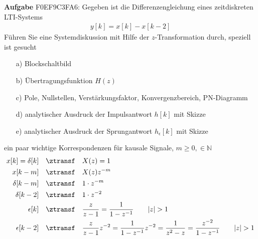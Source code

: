 \textbf{Aufgabe} {\tiny F0EF9C3FA6}:
%
Gegeben ist die Differenzengleichung eines zeitdiskreten LTI-Systems
\begin{align}
y[k] = x[k] - x[k-2]
\end{align}
Führen Sie eine Systemdiskussion mit Hilfe der $z$-Transformation durch, speziell
ist gesucht
\begin{itemize}
\item[a)] Blockschaltbild
\item[b)] Übertragungsfunktion $H(z)$
\item[c)] Pole, Nullstellen, Verstärkungsfaktor, Konvergenzbereich, PN-Diagramm
\item[d)] analytischer Ausdruck der Impulsantwort $h[k]$ mit Skizze
\item[e)] analytischer Ausdruck der Sprungantwort $h_\epsilon[k]$ mit Skizze
\end{itemize}

\begin{Werkzeug}
ein paar wichtige Korrespondenzen für kausale Signale, $m\geq 0, \in\mathbb{N}$
\begin{align}
x[k] = \delta[k]  \quad\ztransf\quad& X(z) = 1\\
x[k-m]  \quad\ztransf\quad& X(z) z^{-m}\\
\delta[k-m]  \quad\ztransf\quad& 1 \cdot z^{-m}\\
\delta[k-2]  \quad\ztransf\quad& 1 \cdot z^{-2}\\
\epsilon[k] \quad\ztransf\quad& \frac{z}{z-1} = \frac{1}{1-z^{-1}}\qquad |z|>1\\
\epsilon[k-2] \quad\ztransf\quad& \frac{z}{z-1} z^{-2}= \frac{1}{1-z^{-1}} z^{-2} = \frac{1}{z^2-z} = \frac{z^{-2}}{1-z^{-1}} \qquad |z|>1
\end{align}
\end{Werkzeug}

